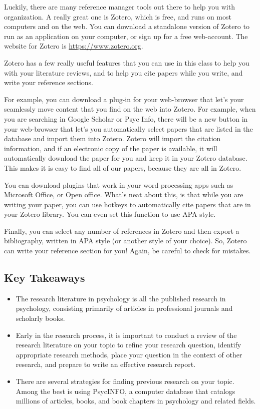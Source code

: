 Luckily, there are many reference manager tools out there to help you with organization. A really great one is Zotero, which is free, and runs on most computers and on the web. You can download a standalone version of Zotero to run as an application on your computer, or sign up for a free web-account. The website for Zotero is \url{https://www.zotero.org}.

Zotero has a few really useful features that you can use in this class to help you with your literature reviews, and to help you cite papers while you write, and write your reference sections.

For example, you can download a plug-in for your web-browser that let's your seamlessly move content that you find on the web into Zotero. For example, when you are searching in Google Scholar or Psyc Info, there will be a new button in your web-browser that let's you automatically select papers that are listed in the database and import them into Zotero. Zotero will import the citation information, and if an electronic copy of the paper is available, it will automatically download the paper for you and keep it in your Zotero database. This makes it is easy to find all of our papers, because they are all in Zotero.

You can download plugins that work in your word processing apps such as Microsoft Office, or Open office. What's neat about this, is that while you are writing your paper, you can use hotkeys to automatically cite papers that are in your Zotero library. You can even set this function to use APA style.

Finally, you can select any number of references in Zotero and then export a bibliography, written in APA style (or another style of your choice). So, Zotero can write your reference section for you! Again, be careful to check for mistakes.

\subsection{Key Takeaways}
\begin{fullwidth}
\begin{itemize}
\item The research literature in psychology is all the published research in psychology, consisting primarily of articles in professional journals and scholarly books.
\item Early in the research process, it is important to conduct a review of the research literature on your topic to refine your research question, identify appropriate research methods, place your question in the context of other research, and prepare to write an effective research report.
\item There are several strategies for finding previous research on your topic. Among the best is using PsycINFO, a computer database that catalogs millions of articles, books, and book chapters in psychology and related fields.
\end{itemize}
\end{fullwidth}

